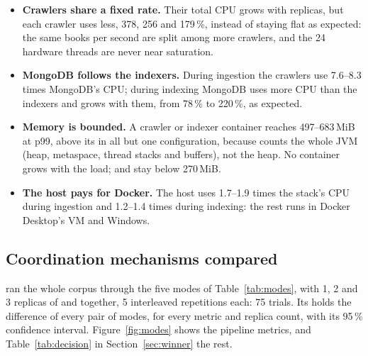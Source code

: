 \begin{itemize}
\item \textbf{Crawlers share a fixed rate.} Their total CPU grows with replicas, but each crawler uses less, 378, 256
  and 179\,\%, instead of staying flat as expected: the same books per second are split among more crawlers, and the
  24 hardware threads are never near saturation.
\item \textbf{MongoDB follows the indexers.} During ingestion the crawlers use 7.6--8.3 times MongoDB's CPU; during
  indexing MongoDB uses more CPU than the indexers and grows with them, from 78\,\% to 220\,\%, as expected.
\item \textbf{Memory is bounded.} A crawler or indexer container reaches 497--683\,MiB at p99, above its
   in all but one configuration, because  counts the whole JVM (heap, metaspace,
  thread stacks and buffers), not the heap. No container grows with the load;  and  stay
  below 270\,MiB.
\item \textbf{The host pays for Docker.} The host uses 1.7--1.9 times the stack's CPU during ingestion and 1.2--1.4
  times during indexing: the rest runs in Docker Desktop's VM and Windows.
\end{itemize}

\subsection{Coordination mechanisms compared}
\label{sec:modes}

 ran the whole corpus through the five modes of Table~\ref{tab:modes}, with 1, 2 and 3
replicas of  and  together, 5 interleaved repetitions each: 75 trials. Its
 holds the difference of every pair of modes, for every metric and replica count, with its 95\,\%
confidence interval. Figure~\ref{fig:modes} shows the pipeline metrics, and Table~\ref{tab:decision} in
Section~\ref{sec:winner} the rest.

